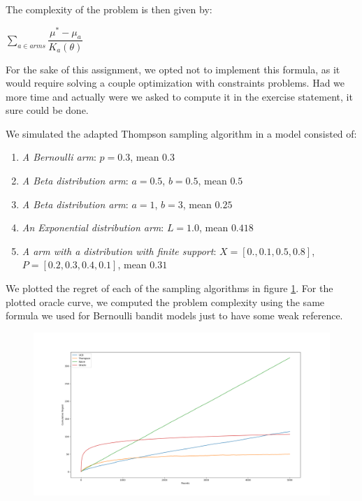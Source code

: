 \documentclass[a4paper]{article}
\begin{document}
The complexity of the problem is then given by:

\begin{center}
    $\sum\limits_{a \in arms} \dfrac{\mu^* - \mu_a}{K_a(\theta)}$
\end{center}

For the sake of this assignment, we opted not to implement this formula, as it would require solving a couple optimization with constraints problems. Had we more time and actually were we asked to compute it in the exercise statement, it sure could be done.

We simulated the adapted Thompson sampling algorithm in a model consisted of:

\begin{enumerate}
    \item \textit{A Bernoulli arm}: $p = 0.3$, mean $0.3$
    \item \textit{A Beta distribution arm}: $a = 0.5$, $b = 0.5$, mean $0.5$
    \item \textit{A Beta distribution arm}: $a = 1$, $b = 3$, mean $0.25$
    \item \textit{An Exponential distribution arm}: $L = 1.0$, mean $0.418$
    \item \textit{A arm with a distribution with finite support}: $X = [0., 0.1, 0.5, 0.8]$, $P = [0.2, 0.3, 0.4, 0.1]$, mean $0.31$
\end{enumerate}

We plotted the regret of each of the sampling algorithms in figure \ref{fig:non_parametric_problem}. For the plotted oracle curve, we computed the problem complexity using the same formula we used for Bernoulli bandit models just to have some weak reference.

\begin{figure}
\centering
\includegraphics[width=1\textwidth]{../img/Regret curves for non parametric problem.png}
\caption{\label{fig:non_parametric_problem}}
\end{figure}
\end{document}
